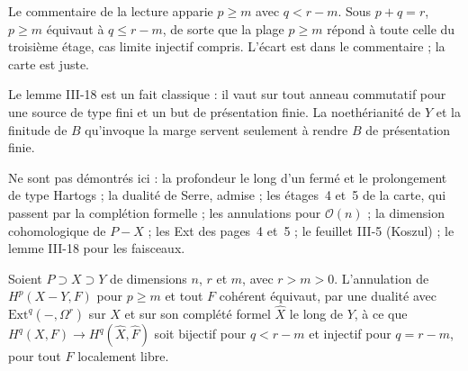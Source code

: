 \begin{remarque}
Le commentaire de la lecture apparie $p \geqslant m$ avec $q < r - m$. Sous $p + q = r$, $p \geqslant m$ équivaut à $q \leqslant r - m$, de sorte que la plage $p \geqslant m$ répond à toute celle du troisième étage, cas limite injectif compris. L'écart est dans le commentaire ; la carte est juste.
\end{remarque}

\begin{remarque}
Le lemme III-18 est un fait classique : il vaut sur tout anneau commutatif pour une source de type fini et un but de présentation finie. La noethérianité de $Y$ et la finitude de $B$ qu'invoque la marge servent seulement à rendre $B$ de présentation finie.
\end{remarque}

Ne sont pas démontrés ici : la profondeur le long d'un fermé et le prolongement de type Hartogs ; la dualité de Serre, admise ; les étages~4 et~5 de la carte, qui passent par la complétion formelle ; les annulations pour $\mathcal O(n)$ ; la dimension cohomologique de $P - X$ ; les Ext des pages~4 et~5 ; le feuillet III-5 (Koszul) ; le lemme III-18 pour les faisceaux.

\begin{encadre}
\begin{theoreme*}\nonverifie
Soient $P \supset X \supset Y$ de dimensions $n$, $r$ et $m$, avec $r > m > 0$. L'annulation de $H^p(X - Y, F)$ pour $p \geq m$ et tout $F$ cohérent équivaut, par une dualité avec $\mathrm{Ext}^q(-, \Omega^r)$ sur $X$ et sur son complété formel $\hat X$ le long de $Y$, à ce que $H^q(X, F) \to H^q(\hat X, \hat F)$ soit bijectif pour $q < r - m$ et injectif pour $q = r - m$, pour tout $F$ localement libre.
\end{theoreme*}
\end{encadre}
